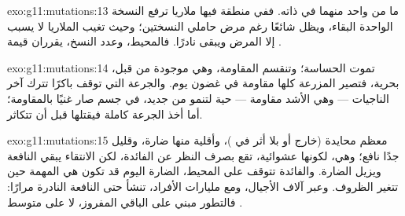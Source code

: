 \begin{solution}{exo:g11:mutations:13}
ما من واحد منهما في ذاته. ففي منطقة فيها ملاريا ترفع النسخة الواحدة
البقاء، ويظل  شائعًا رغم مرض حاملي النسختين؛ وحيث تغيب الملاريا
لا يسبب إلا المرض ويبقى نادرًا. فالمحيط، وعدد النسخ، يقرران قيمة
.
\end{solution}

\begin{solution}{exo:g11:mutations:14}
تموت  الحساسة؛ وتنقسم المقاومة، وهي موجودة من قبل، بحرية،
فتصير المزرعة كلها مقاومة في غضون يوم. والجرعة التي توقف باكرًا تترك
آخر الناجيات --- وهي الأشد مقاومة --- حية لتنمو من جديد، في جسم صار
غنيًا بالمقاومة؛ أما أخذ الجرعة كاملة فيقتلها قبل أن تتكاثر.
\end{solution}

\begin{solution}{exo:g11:mutations:15}
معظم  محايدة (خارج  أو بلا أثر في )، وأقلية
منها ضارة، وقليل جدًا نافع؛ وهي، لكونها عشوائية، تقع بصرف النظر عن
الفائدة، لكن الانتقاء يبقي النافعة ويزيل الضارة. والفائدة تتوقف على
المحيط،  الضارة اليوم قد تكون هي المهمة حين تتغير الظروف. وعبر
آلاف الأجيال، ومع مليارات الأفراد، تنشأ حتى  النافعة النادرة
مرارًا: فالتطور مبني على الباقي المفروز، لا على متوسط .
\end{solution}

